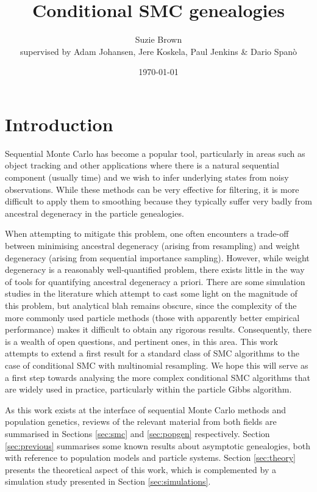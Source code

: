 \documentclass{article}
\title{Conditional SMC genealogies}
\author{Suzie Brown\\ {\small supervised by Adam Johansen, Jere Koskela, Paul Jenkins \& Dario Span\`o}}
\date{\today}
\begin{document}
\maketitle

\section{Introduction}
Sequential Monte Carlo has become a popular tool, particularly in areas such as object tracking and other applications where there is a natural sequential component (usually time) and we wish to infer underlying states from noisy observations.
While these methods can be very effective for filtering, it is more difficult to apply them to smoothing because they typically suffer very badly from ancestral degeneracy in the particle genealogies.

When attempting to mitigate this problem, one often encounters a trade-off between minimising ancestral degeneracy (arising from resampling) and weight degeneracy (arising from sequential importance sampling). However, while weight degeneracy is a reasonably well-quantified problem, there exists little in the way of tools for quantifying ancestral degeneracy a priori. There are some simulation studies in the literature which attempt to cast some light on the magnitude of this problem, but analytical blah remains obscure, since the complexity of the more commonly used particle methods (those with apparently better empirical performance) makes it difficult to obtain any rigorous results.
Consequently, there is a wealth of open questions, and pertinent ones, in this area. This work attempts to extend a first result for a standard class of SMC algorithms to the case of conditional SMC with multinomial resampling. We hope this will serve as a first step towards analysing the more complex conditional SMC algorithms that are widely used in practice, particularly within the particle Gibbs algorithm.

As this work exists at the interface of sequential Monte Carlo methods and population genetics, reviews of the relevant material from both fields are summarised in Sections \ref{sec:smc} and \ref{sec:popgen} respectively. 
Section \ref{sec:previous} summarises some known results about asymptotic genealogies, both with reference to population models and particle systems.
Section \ref{sec:theory} presents the theoretical aspect of this work, which is complemented by a simulation study presented in Section \ref{sec:simulations}.
\end{document}
